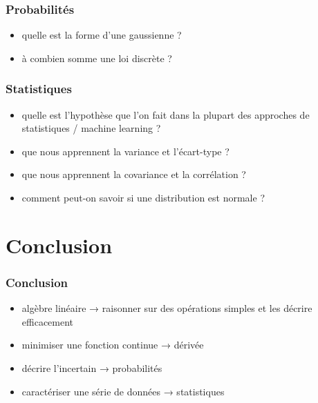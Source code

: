 \documentclass{formation}
\begin{document}
\begin{frame}
  \frametitle{Probabilités}

  \begin{itemize}[<+->]
  \item quelle est la forme d'une gaussienne ?
  \item à combien somme une loi discrète ?
  \end{itemize}
\end{frame}

\begin{frame}
  \frametitle{Statistiques}

  \begin{itemize}[<+->]
  \item quelle est l'hypothèse que l'on fait dans la plupart des
    approches de statistiques / machine learning ?
  \item que nous apprennent la variance et l'écart-type ?
  \item que nous apprennent la covariance et la corrélation ?
  \item comment peut-on savoir si une distribution est normale ?
  \end{itemize}
\end{frame}

\section{Conclusion}

\begin{frame}
  \frametitle{Conclusion}

  \begin{itemize}
  \item algèbre linéaire → raisonner sur des opérations simples
    et les décrire efficacement
  \item minimiser une fonction continue → dérivée
  \item décrire l'incertain → probabilités
  \item caractériser une série de données → statistiques
  \end{itemize}
\end{frame}
\end{document}
